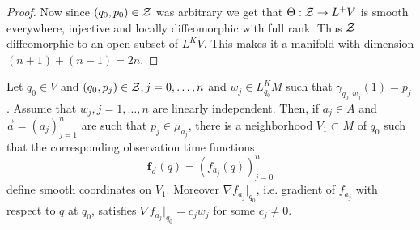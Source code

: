 \begin{proof}
    Now since $(q_0,p_0)\in {\mathcal{Z}}$ was arbitrary we get that $\Theta:{\mathcal{Z}}\to L^+V$ is smooth everywhere, injective and locally diffeomorphic with full rank. Thus ${\mathcal{Z}}$ diffeomorphic to an open subset of $L^KV$. This makes it a manifold with dimension $(n+1)+(n-1)=2n$.
\end{proof}

\begin{proposition}\label{prop:observationtimecoordinates}
Let $q_0\in V$ and $(q_0,p_j)\in {\mathcal{Z}}, j=0,\dots, n$ and $w_j\in L^K_{q_0}M$ such that $\gamma_{q_0,w_j}(1) = p_j$. Assume that $w_j, j=1,\dots, n$ are linearly independent. Then, if $a_j\in A$ and $\overrightarrow{a} = (a_j)^n_{j=1}$ are such that $p_j\in \mu_{a_j}$, there is a neighborhood $V_1\subset M$ of $q_0$ such that the corresponding observation time functions 
\[
\mathbf{f}_{\overrightarrow{a}}(q) = (f_{a_j}(q))^n_{j=0}
\]
define smooth coordinates on $V_1$. Moreover $\nabla f_{a_j}\rvert_{q_0}$, i.e. gradient of $f_{a_j}$ with respect to $q$ at $q_0$, satisfies $\nabla f_{a_j}\rvert_{q_0} = c_jw_j$ for some $c_j\neq 0$.
\end{proposition}

